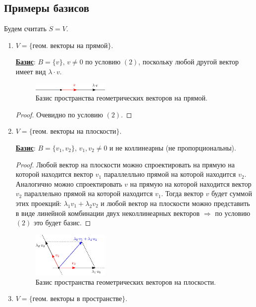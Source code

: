 \documentclass[12pt]{article}
\theoremstyle{definition}
\begin{document}
\subsection*{Примеры базисов}
Будем считать $S = V$.
\begin{enumerate}[label=(\arabic*)]
	\item $V = \{\text{геом. векторы на прямой}\}$.
	
	\textbf{\uline{Базис}}: $B = \{v\}, \, v \neq 0$ по условию $(2)$, поскольку любой другой вектор имеет вид $\lambda{\cdot}v$.
	\begin{figure}[H]
		\centering
		\includegraphics[width=0.35\textwidth]{AL3_1.eps}
		\caption{Базис пространства геометрических векторов на прямой.}
		\label{3_1}
	\end{figure}
	\begin{proof}
		Очевидно по условию $(2)$.
	\end{proof}
	\item $V = \{\text{геом. векторы на плоскости}\}$.
	
	\textbf{\uline{Базис}}: $B = \{v_1, v_2\}, \, v_1,v_2 \neq 0$ и не коллинеарны (не пропорциональны). 
	\begin{proof}
		Любой вектор на плоскости можно спроектировать на прямую на которой находится вектор $v_1$ параллелльно прямой на которой находится $v_2$. Аналогично можно спроектировать $v$ на прямую на которой находится вектор $v_2$ параллельно прямой на которой находится $v_1$. Тогда вектор $v$ будет суммой этих проекций: $\lambda_1 v_1 + \lambda_2 v_2$ и любой вектор на плоскости можно представить в виде линейной комбинации двух неколлинеарных векторов $\Rightarrow$ по  условию $(2)$ это будет базис.
	\end{proof}

	\begin{figure}[H]
		\centering
		\includegraphics[width=0.35\textwidth]{AL3_2.eps}
		\caption{Базис пространства геометрических векторов на плоскости.}
		\label{3_2}
	\end{figure}

	\item $V = \{\text{геом. векторы в пространстве}\}$.
	

\end{enumerate}
\end{document}
